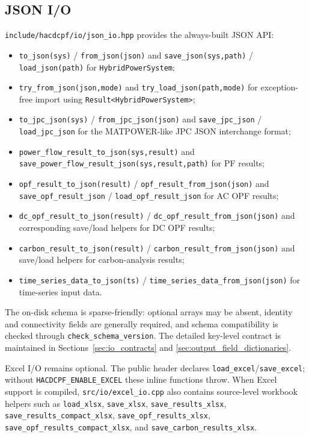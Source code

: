 \subsection{JSON I/O}
\label{sec:json-io}

\texttt{include/hacdcpf/io/json\_io.hpp} provides the always-built JSON API:
\begin{itemize}
  \item \texttt{to\_json(sys)} / \texttt{from\_json(json)} and
        \texttt{save\_json(sys,path)} / \texttt{load\_json(path)} for
        \texttt{HybridPowerSystem};
  \item \texttt{try\_from\_json(json,mode)} and
        \texttt{try\_load\_json(path,mode)} for exception-free import using
        \texttt{Result<HybridPowerSystem>};
  \item \texttt{to\_jpc\_json(sys)} / \texttt{from\_jpc\_json(json)} and
        \texttt{save\_jpc\_json} / \texttt{load\_jpc\_json} for the
        MATPOWER-like JPC JSON interchange format;
  \item \texttt{power\_flow\_result\_to\_json(sys,result)} and
        \texttt{save\_power\_flow\_result\_json(sys,result,path)} for PF
        results;
  \item \texttt{opf\_result\_to\_json(result)} /
        \texttt{opf\_result\_from\_json(json)} and
        \texttt{save\_opf\_result\_json} / \texttt{load\_opf\_result\_json}
        for AC OPF results;
  \item \texttt{dc\_opf\_result\_to\_json(result)} /
        \texttt{dc\_opf\_result\_from\_json(json)} and corresponding
        save/load helpers for DC OPF results;
  \item \texttt{carbon\_result\_to\_json(result)} /
        \texttt{carbon\_result\_from\_json(json)} and save/load helpers for
        carbon-analysis results;
  \item \texttt{time\_series\_data\_to\_json(ts)} /
        \texttt{time\_series\_data\_from\_json(json)} for time-series input
        data.
\end{itemize}
The on-disk schema is sparse-friendly: optional arrays may be absent, identity
and connectivity fields are generally required, and schema compatibility is
checked through \texttt{check\_schema\_version}.  The detailed key-level
contract is maintained in Sections~\ref{sec:io_contracts} and
\ref{sec:output_field_dictionaries}.

Excel I/O remains optional.  The public header declares
\texttt{load\_excel}/\texttt{save\_excel}; without
\texttt{HACDCPF\_ENABLE\_EXCEL} these inline functions throw.  When Excel
support is compiled, \texttt{src/io/excel\_io.cpp} also contains source-level
workbook helpers such as \texttt{load\_xlsx}, \texttt{save\_xlsx},
\texttt{save\_results\_xlsx}, \texttt{save\_results\_compact\_xlsx},
\texttt{save\_opf\_results\_xlsx}, \texttt{save\_opf\_results\_compact\_xlsx},
and \texttt{save\_carbon\_results\_xlsx}.

